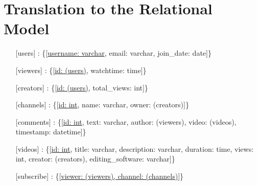 


	
\section{Translation to the Relational Model}

\begin{itemize}
	\item[] [users] : \{[\underline{username: varchar}, email: varchar, join\_date: date]\}
	\item[] [viewers] : \{[\underline{id: (users)}, watchtime: time]\}
	\item[] [creators] : \{[\underline{id: (users)}, total\_views: int]\}
	\item[] [channels] : \{[\underline{id: int}, name: varchar, owner: (creators)]\}
	\item[] [comments] : \{[\underline{id: int}, text: varchar, author: (viewers), video: (videos), timestamp: datetime]\}
	\item[] [videos] : \{[\underline{id: int}, title: varchar, description: varchar, duration: time, views: int, creator: (creators), editing\_software: varchar]\}
	\item[] [subscribe] : \{[\underline{viewer: (viewers), channel: (channels)}]\}
\end{itemize}

